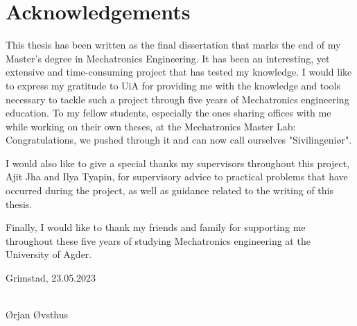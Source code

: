 \chapter*{Acknowledgements}
This thesis has been written as the final dissertation that marks the end of my Master's degree in Mechatronics Engineering. It has been an interesting, yet extensive and time-consuming project that has tested my knowledge. I would like to express my gratitude to UiA for providing me with the knowledge and tools necessary to tackle such a project through five years of Mechatronics engineering education. To my fellow students, especially the ones sharing offices with me while working on their own theses, at the Mechatronics Master Lab: Congratulations, we pushed through it and can now call ourselves "Sivilingeniør".

I would also like to give a special thanks my supervisors throughout this project, Ajit Jha and Ilya Tyapin, for supervisory advice to practical problems that have occurred during the project, as well as guidance related to the writing of this thesis.

Finally, I would like to thank my friends and family for supporting me throughout these five years of studying Mechatronics engineering at the University of Agder. 


\vspace{5cm}
\begin{center}
Grimstad, 23.05.2023
\end{center}

\vspace{5ex}
\begin{center}
\makebox[3.1in]{\hrulefill}\\
Ørjan Øvsthus
\end{center}